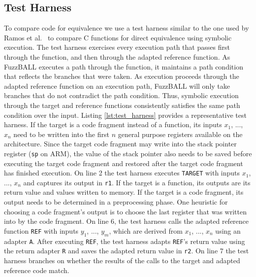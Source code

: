\subsection{Test Harness}
%
To compare code for equivalence we use a test harness similar to the one used by Ramos et al.~\cite{Ramos:2011:PLE:2032305.2032360} to compare C functions for direct equivalence using symbolic execution.
%
The test harness exercises every execution path that passes first through the function, and then through the adapted reference function.
%
As FuzzBALL executes a path through the function, it maintains a path condition that reflects the branches that were taken.
%
As execution proceeds through the adapted reference function on an execution path, FuzzBALL will only take branches that do not contradict the path condition.
%
Thus, symbolic execution through the target and reference functions consistently satisfies the same path condition over the input.
%
Listing \ref{lst:test_harness} provides a representative test harness.
%
If the target is a code fragment instead of a function, its inputs $x_1$, ..., $x_n$ need to be written into the first $n$ general purpose registers available on the architecture.
%
Since the target code fragment may write into the stack pointer register ({\tt sp} on ARM), the value of the stack pointer also needs to be saved before executing the target code fragment and restored after the target code fragment has finished execution.
%
On line 2 the test harness executes
\texttt{TARGET} with inputs $x_1$, ..., $x_n$ and captures its output in {\tt r1}.
%
If the target is a function, its outputs are its return value and values
written to memory.
%
If the target is a code fragment, its output needs to be determined in a preprocessing phase.
%
One heuristic for choosing a code fragment\rq s output is to choose the last register that was written into by the code fragment.
%
On line 6, the test harness calls the adapted reference function \texttt{REF} with
inputs $y_1$, ..., $y_m$, which are derived from $x_1$, ..., $x_n$ using
an adapter \texttt{A}.
%
After executing {\tt REF}, the test harness adapts {\tt REF}\rq s return value using the return adapter {\tt R} and saves the adapted return value in {\tt r2}.
%
On line 7 the test harness branches on whether the results of the calls to the target and adapted reference code match.
%

%

